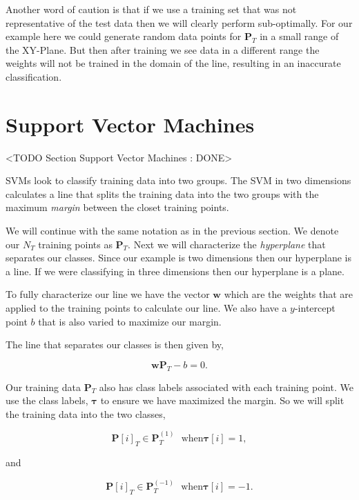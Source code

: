 Another word of caution is that if we use a training set that was not representative of the test data then we will clearly perform sub-optimally. For our example here we could generate random data points for $\mathbf{P}_T$ in a small range of the XY-Plane. But then after training we see data in a different range the weights will not be trained in the domain of the line, resulting in an inaccurate classification.

	
\section{Support Vector Machines}
	<TODO Section Support Vector Machines : DONE>
	
\ac{SVM}s look to classify training data into two groups. The \ac{SVM} in two dimensions calculates a line that splits the training data into the two groups with the maximum \emph{margin} between the closet training points. 

We will continue with the same notation as in the previous section. We denote our $N_T$ training points as $\mathbf{P}_T$. Next we will characterize the \emph{hyperplane} that separates our classes. Since our example is two dimensions then our hyperplane is a line. If we were classifying in three dimensions then our hyperplane is a plane. 

To fully characterize our line we have the vector $\mathbf{w}$ which are the weights that are applied to the training points to calculate our line. We also have a $y$-intercept point $b$ that is also varied to maximize our margin. 

The line that separates our classes is then given by,

\begin{equation}
\mathbf{w}\mathbf{P}_T - b = 0.
\end{equation}

Our training data $\mathbf{P}_T$ also has class labels associated with each training point. We use the class labels, $\mathbf{\tau}$ to ensure we have maximized the margin. So we will split the training data into the two classes, 

\begin{equation}
\mathbf{P}[i]_T \in \mathbf{P}^{(1)}_T ~~~ \text{when} \mathbf{\tau}[i] = 1,
\end{equation}
	
and

\begin{equation}
\mathbf{P}[i]_T \in \mathbf{P}^{(-1)}_T ~~~ \text{when} \mathbf{\tau}[i] = -1.
\end{equation}

